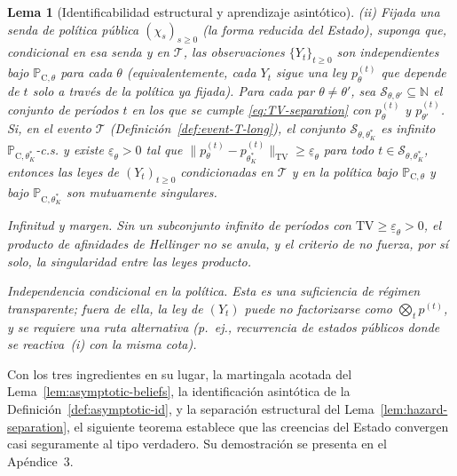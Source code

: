 \documentclass[review,authoryear,12pt]{elsarticle}
\theoremstyle{plain}
\newtheorem{lemma}[theorem]{Lema}
\theoremstyle{definition}
\newcommand{\ProbC}[1]{\mathbb{P}_{\mathrm{C},#1}}
\newcommand{\1}{\mathbf{1}}
\begin{document}
\begin{lemma}[Identificabilidad estructural y aprendizaje asintótico]
\medskip
\noindent\textup{(ii)}
Fijada una senda de política pública $(\chi_s)_{s\ge 0}$ \textup{(}la forma reducida del Estado\textup{)}, suponga que, condicional en esa senda y en $\mathcal{T}$, las observaciones $\{Y_t\}_{t\ge 0}$ son independientes bajo $\ProbC{\theta}$ para cada $\theta$ \textup{(}equivalentemente, cada $Y_t$ sigue una ley $p_\theta^{(t)}$ que depende de $t$ solo a través de la política ya fijada\textup{)}. Para cada par $\theta\neq\theta'$, sea $\mathcal{S}_{\theta,\theta'}\subseteq\mathbb{N}$ el conjunto de períodos $t$ en los que se cumple \eqref{eq:TV-separation} con $p_\theta^{(t)}$ y $p_{\theta'}^{(t)}$. Si, en el evento $\mathcal{T}$ \textup{(}Definición~\ref{def:event-T-long}\textup{)}, el conjunto $\mathcal{S}_{\theta,\theta_K^\ast}$ es infinito $\ProbC{\theta_K^\ast}$-c.s. y existe $\underline{\varepsilon}_{\theta}>0$ tal que $\|p_\theta^{(t)}-p_{\theta_K^\ast}^{(t)}\|_{\mathrm{TV}}\ge \underline{\varepsilon}_{\theta}$ para todo $t\in\mathcal{S}_{\theta,\theta_K^\ast}$, entonces las leyes de $(Y_t)_{t\ge 0}$ condicionadas en $\mathcal{T}$ y en la política bajo $\ProbC{\theta}$ y bajo $\ProbC{\theta_K^\ast}$ son mutuamente singulares.

\medskip
\begin{list}{}{%
  \setlength{\leftmargin}{2.25em}%
  \setlength{\labelwidth}{2.25em}%
  \setlength{\labelsep}{0.45em}%
  \setlength{\itemsep}{0.35em}%
  \setlength{\parsep}{0pt}%
  \setlength{\topsep}{0.25em}%
}
\item[\textup{(C3)}] \textup{Infinitud y margen.}\quad
Sin un subconjunto infinito de períodos con $\mathrm{TV}\ge\underline{\varepsilon}_\theta>0$, el producto de afinidades de Hellinger no se anula, y el criterio de \citet{Kakutani1948} no fuerza, por sí solo, la singularidad entre las leyes producto.
\item[\textup{(C4)}] \textup{Independencia condicional en la política.}\quad
Esta es una suficiencia de régimen transparente; fuera de ella, la ley de $(Y_t)$ puede no factorizarse como $\bigotimes_t p^{(t)}$, y se requiere una ruta alternativa \textup{(}p.\ ej., recurrencia de estados públicos donde se reactiva~\textup{(i)} con la misma cota\textup{)}.
\end{list}
\end{lemma}

Con los tres ingredientes en su lugar, la martingala acotada del Lema~\ref{lem:asymptotic-beliefs}, la identificación asintótica de la Definición~\ref{def:asymptotic-id}, y la separación estructural del Lema~\ref{lem:hazard-separation}, el siguiente teorema establece que las creencias del Estado convergen casi seguramente al tipo verdadero. Su demostración se presenta en el Apéndice~3.
\end{document}
